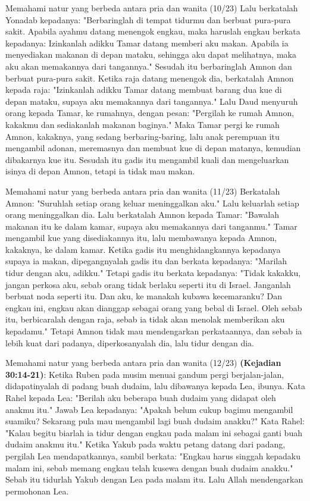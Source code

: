 \documentclass{beamer}
\theoremstyle{mystyle}
\let\emph\relax %
\begin{document}
\begin{frame}{Memahami natur yang berbeda antara pria dan wanita (10/23)}
Lalu berkatalah Yonadab kepadanya: "Berbaringlah di tempat tidurmu dan berbuat pura-pura sakit. Apabila ayahmu datang menengok engkau, maka haruslah engkau berkata kepadanya: Izinkanlah adikku Tamar datang memberi aku makan. Apabila ia menyediakan makanan di depan mataku, sehingga aku dapat melihatnya, maka aku akan memakannya dari tangannya." Sesudah itu berbaringlah Amnon dan berbuat pura-pura sakit. Ketika raja datang menengok dia, berkatalah Amnon kepada raja: "Izinkanlah adikku Tamar datang membuat barang dua kue di depan mataku, supaya aku memakannya dari tangannya." Lalu Daud menyuruh orang kepada Tamar, ke rumahnya, dengan pesan: "Pergilah ke rumah Amnon, kakakmu dan sediakanlah makanan baginya." Maka Tamar pergi ke rumah Amnon, kakaknya, yang sedang berbaring-baring, lalu anak perempuan itu mengambil adonan, meremasnya dan membuat kue di depan matanya, kemudian dibakarnya kue itu. Sesudah itu gadis itu mengambil kuali dan mengeluarkan isinya di depan Amnon, tetapi ia tidak mau makan. 	
\end{frame}

\begin{frame}{Memahami natur yang berbeda antara pria dan wanita (11/23)}
Berkatalah Amnon: "Suruhlah setiap orang keluar meninggalkan aku." Lalu keluarlah setiap orang meninggalkan dia. Lalu berkatalah Amnon kepada Tamar: "Bawalah makanan itu ke dalam kamar, supaya aku memakannya dari tanganmu." Tamar mengambil kue yang disediakannya itu, lalu membawanya kepada Amnon, kakaknya, ke dalam kamar. Ketika gadis itu menghidangkannya kepadanya supaya ia makan, dipegangnyalah gadis itu dan berkata kepadanya: "Marilah tidur dengan aku, adikku." Tetapi gadis itu berkata kepadanya: "Tidak kakakku, jangan perkosa aku, sebab orang tidak berlaku seperti itu di Israel. Janganlah berbuat noda seperti itu. Dan aku, ke manakah kubawa kecemaranku? Dan engkau ini, engkau akan dianggap sebagai orang yang bebal di Israel. Oleh sebab itu, berbicaralah dengan raja, sebab ia tidak akan menolak memberikan aku kepadamu." Tetapi Amnon tidak mau mendengarkan perkataannya, dan sebab ia lebih kuat dari padanya, diperkosanyalah dia, lalu tidur dengan dia.	
\end{frame}

\begin{frame}{Memahami natur yang berbeda antara pria dan wanita (12/23)}
\emph{Lea} \textbf{(Kejadian 30:14-21)}: Ketika Ruben pada musim menuai gandum pergi berjalan-jalan, didapatinyalah di padang buah dudaim, lalu dibawanya kepada Lea, ibunya. Kata Rahel kepada Lea: "Berilah aku beberapa buah dudaim yang didapat oleh anakmu itu." Jawab Lea kepadanya: "Apakah belum cukup bagimu mengambil suamiku? Sekarang pula mau mengambil lagi buah dudaim anakku?" Kata Rahel: "Kalau begitu biarlah ia tidur dengan engkau pada malam ini sebagai ganti buah dudaim anakmu itu." Ketika Yakub pada waktu petang datang dari padang, pergilah Lea mendapatkannya, sambil berkata: "Engkau harus singgah kepadaku malam ini, sebab memang engkau telah kusewa dengan buah dudaim anakku." Sebab itu tidurlah Yakub dengan Lea pada malam itu. Lalu Allah mendengarkan permohonan Lea. 
\end{frame}
\end{document}
